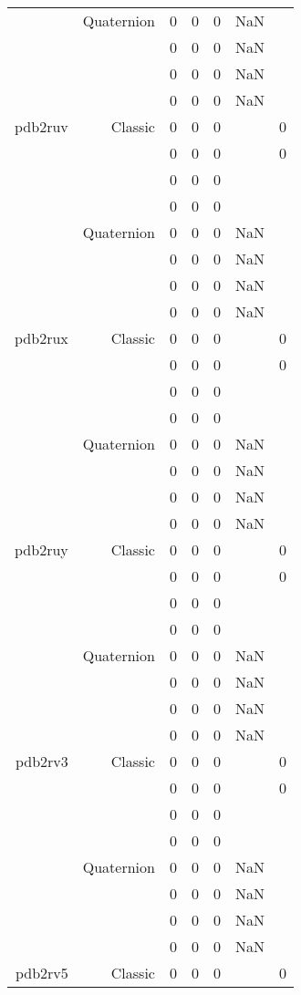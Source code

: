 \begin{xltabular}{\textwidth}{r|rcccSc}
& Quaternion & 0 & 0 & 0 & NaN & \\
& & 0 & 0 & 0 & NaN & \\
& & 0 & 0 & 0 & NaN & \\
& & 0 & 0 & 0 & NaN & \\ \addlinespace
pdb2ruv & Classic & 0 & 0 & 0 & & 0 \\
& & 0 & 0 & 0 & & 0 \\
& & 0 & 0 & 0 & & \\
& & 0 & 0 & 0 & & \\
& Quaternion & 0 & 0 & 0 & NaN & \\
& & 0 & 0 & 0 & NaN & \\
& & 0 & 0 & 0 & NaN & \\
& & 0 & 0 & 0 & NaN & \\ \addlinespace
pdb2rux & Classic & 0 & 0 & 0 & & 0 \\
& & 0 & 0 & 0 & & 0 \\
& & 0 & 0 & 0 & & \\
& & 0 & 0 & 0 & & \\
& Quaternion & 0 & 0 & 0 & NaN & \\
& & 0 & 0 & 0 & NaN & \\
& & 0 & 0 & 0 & NaN & \\
& & 0 & 0 & 0 & NaN & \\ \addlinespace
pdb2ruy & Classic & 0 & 0 & 0 & & 0 \\
& & 0 & 0 & 0 & & 0 \\
& & 0 & 0 & 0 & & \\
& & 0 & 0 & 0 & & \\
& Quaternion & 0 & 0 & 0 & NaN & \\
& & 0 & 0 & 0 & NaN & \\
& & 0 & 0 & 0 & NaN & \\
& & 0 & 0 & 0 & NaN & \\ \addlinespace
pdb2rv3 & Classic & 0 & 0 & 0 & & 0 \\
& & 0 & 0 & 0 & & 0 \\
& & 0 & 0 & 0 & & \\
& & 0 & 0 & 0 & & \\
& Quaternion & 0 & 0 & 0 & NaN & \\
& & 0 & 0 & 0 & NaN & \\
& & 0 & 0 & 0 & NaN & \\
& & 0 & 0 & 0 & NaN & \\ \addlinespace
pdb2rv5 & Classic & 0 & 0 & 0 & & 0 \\

\end{xltabular}
